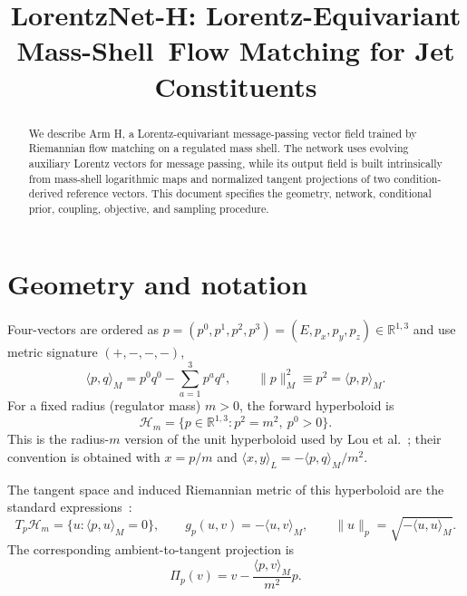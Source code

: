 \documentclass[10pt]{article}
\title{LorentzNet-H: Lorentz-Equivariant Mass-Shell\
Flow Matching for Jet Constituents}
\author{}
\date{}
\newcommand{\HH}{\mathcal{H}}
\newcommand{\Proj}{\Pi}
\newcommand{\R}{\mathbb{R}}
\begin{document}
\maketitle

\begin{abstract}
We describe Arm H, a Lorentz-equivariant message-passing vector field trained by
Riemannian flow matching on a regulated mass shell. The network uses evolving
auxiliary Lorentz vectors for message passing, while its output field is built
intrinsically from mass-shell logarithmic maps and normalized tangent projections
of two condition-derived reference vectors. This document specifies the geometry,
network, conditional prior, coupling, objective, and sampling procedure.
\end{abstract}

\section{Geometry and notation}

Four-vectors are ordered as $p=(p^0,p^1,p^2,p^3)=(E,p_x,p_y,p_z)\in\R^{1,3}$
and use metric signature $(+,-,-,-)$,
\begin{equation}
 \langle p,q\rangle_M=p^0q^0-\sum_{a=1}^3p^aq^a,
 \qquad \|p\|_M^2\equiv p^2=\langle p,p\rangle_M.
\end{equation}
For a fixed radius (regulator mass) $m>0$, the forward hyperboloid is
\begin{equation}
 \HH_m=\{p\in\R^{1,3}:p^2=m^2,\ p^0>0\}.
\end{equation}
This is the radius-$m$ version of the unit hyperboloid used by
Lou et al.~\cite[Table~2]{lou2020neural}; their convention is obtained with
$x=p/m$ and $\langle x,y\rangle_L=-\langle p,q\rangle_M/m^2$.

The tangent space and induced Riemannian metric of this hyperboloid are
the standard expressions~\cite[Table~2]{lou2020neural}:
\begin{equation}
 T_p\HH_m=\{u:\langle p,u\rangle_M=0\},\qquad
 g_p(u,v)=-\langle u,v\rangle_M,\qquad
 \|u\|_p=\sqrt{-\langle u,u\rangle_M}.
\end{equation}
The corresponding ambient-to-tangent projection is~\cite[Table~2]{lou2020neural}
\begin{equation}
 \Proj_p(v)=v-\frac{\langle p,v\rangle_M}{m^2}p.
 \label{eq:projection}
\end{equation}
\end{document}
